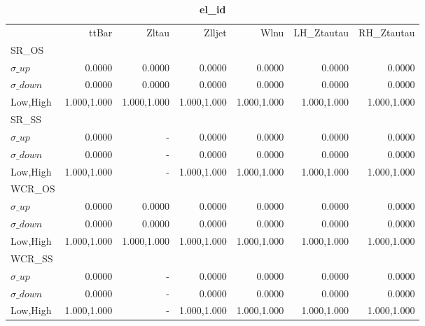 \documentclass[11pt,oneside,a4paper]{article}
\begin{document}
\begin{table}
\caption{\bf{el\_id}}
\centering
\begin{tabular}{lrrrrrr}
& ttBar & Zltau & Zlljet & Wlnu & LH\_Ztautau & RH\_Ztautau \\

SR\_OS &  &  &  &  &  &  \\
$\sigma\_up$ & 0.0000 & 0.0000 & 0.0000 & 0.0000 & 0.0000 & 0.0000 \\
$\sigma\_down$ & 0.0000 & 0.0000 & 0.0000 & 0.0000 & 0.0000 & 0.0000 \\
Low,High & 1.000,1.000 & 1.000,1.000 & 1.000,1.000 & 1.000,1.000 & 1.000,1.000 & 1.000,1.000 \\

\hline
SR\_SS &  &  &  &  &  &  \\
$\sigma\_up$ & 0.0000 & - & 0.0000 & 0.0000 & 0.0000 & 0.0000 \\
$\sigma\_down$ & 0.0000 & - & 0.0000 & 0.0000 & 0.0000 & 0.0000 \\
Low,High & 1.000,1.000 & - & 1.000,1.000 & 1.000,1.000 & 1.000,1.000 & 1.000,1.000 \\

\hline
WCR\_OS &  &  &  &  &  &  \\
$\sigma\_up$ & 0.0000 & 0.0000 & 0.0000 & 0.0000 & 0.0000 & 0.0000 \\
$\sigma\_down$ & 0.0000 & 0.0000 & 0.0000 & 0.0000 & 0.0000 & 0.0000 \\
Low,High & 1.000,1.000 & 1.000,1.000 & 1.000,1.000 & 1.000,1.000 & 1.000,1.000 & 1.000,1.000 \\

\hline
WCR\_SS &  &  &  &  &  &  \\
$\sigma\_up$ & 0.0000 & - & 0.0000 & 0.0000 & 0.0000 & 0.0000 \\
$\sigma\_down$ & 0.0000 & - & 0.0000 & 0.0000 & 0.0000 & 0.0000 \\
Low,High & 1.000,1.000 & - & 1.000,1.000 & 1.000,1.000 & 1.000,1.000 & 1.000,1.000 \\
\end{tabular}
\end{table}
\end{document}
